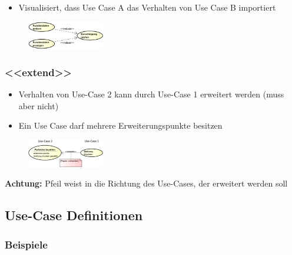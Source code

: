 \documentclass[11pt, a4paper]{article}
\begin{document}
\begin{itemize}
    \item Visualisiert, dass Use Case A das Verhalten von Use Case B importiert
\end{itemize}

\begin{figure}[h]
    \includegraphics[width=0.3\textwidth]{UseCase-11.png}
    \label{fig:UseCase-11}
\end{figure}

\raggedright \subsubsection{<<extend>>}

\begin{itemize}
    \item Verhalten von Use-Case 2 kann durch Use-Case 1 erweitert werden (muss aber nicht)
    \item Ein Use Case darf mehrere Erweiterungspunkte besitzen
\end{itemize}

\begin{figure}[h]
    \includegraphics[width=0.3\textwidth]{UseCase-12.png}
    \label{fig:UseCase-12}
\end{figure}

\textbf{Achtung:} Pfeil weist in die Richtung des Use-Cases, der erweitert werden soll


\subsection{Use-Case Definitionen}

\subsubsection*{Beispiele}
\end{document}
